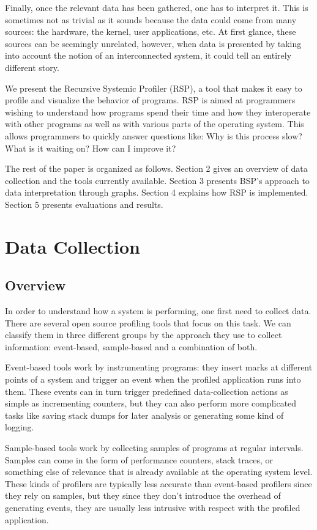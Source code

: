 \documentclass{article}
\begin{document}
Finally, once the relevant data has been gathered, one has to interpret it. This is sometimes not as trivial as it sounds because the data could come from many sources: the hardware, the kernel, user applications, etc. At first glance, these sources can be seemingly unrelated, however, when data is  presented by taking into account the notion of an interconnected system, it could tell an entirely different story.

We present the Recursive Systemic Profiler (RSP), a tool that makes it easy to profile and visualize the behavior of programs. RSP is aimed at programmers wishing to understand how programs spend their time and how they interoperate with other programs as well as with various parts of the operating system. This allows programmers to quickly answer questions like: Why is this process slow? What is it waiting on? How can I improve it?

The rest of the paper is organized as follows. Section 2 gives an overview of data collection and the tools currently available. Section 3 presents BSP's approach to data interpretation through graphs. Section 4 explains how RSP is implemented. Section 5 presents evaluations and results.

\section{Data Collection}
\subsection{Overview}
In order to understand how a system is performing, one first need to collect data. There are several open source profiling tools that focus on this task. We can classify them in three different groups by the approach they use to collect information: event-based, sample-based and a combination of both. 

Event-based tools work by instrumenting programs: they insert marks at different points of a system and trigger an event when the profiled application runs into them. These events can in turn trigger predefined data-collection actions as simple as incrementing counters, but they can also perform more complicated tasks like saving stack dumps for later analysis or generating some kind of logging.

Sample-based tools work by collecting samples of programs at regular intervals.  Samples can come in the form of performance counters, stack traces, or something else of relevance that is already available at the operating system level. These kinds of profilers are typically less accurate than event-based profilers since they rely on samples, but they since they don't introduce the overhead of generating events, they are usually less intrusive with respect with the profiled application.
\end{document}

